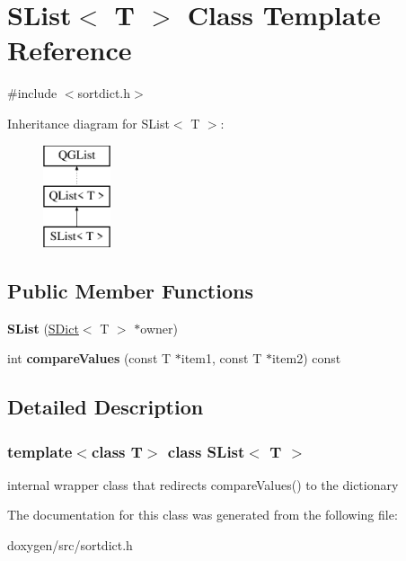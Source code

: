 \hypertarget{class_s_list}{}\section{S\+List$<$ T $>$ Class Template Reference}
\label{class_s_list}


{\ttfamily \#include $<$sortdict.\+h$>$}

Inheritance diagram for S\+List$<$ T $>$\+:\begin{figure}[H]
\begin{center}
\leavevmode
\includegraphics[height=3.000000cm]{class_s_list}
\end{center}
\end{figure}
\subsection*{Public Member Functions}
\begin{DoxyCompactItemize}
\item 
\mbox{\label{class_s_list_a1295b39ee8f007fa3d35a1a41d7db6fe}} 
{\bfseries S\+List} (\mbox{\hyperlink{class_s_dict}{S\+Dict}}$<$ T $>$ $\ast$owner)
\item 
\mbox{\label{class_s_list_a21e540fee479047ea34e99bd296ce01d}} 
int {\bfseries compare\+Values} (const T $\ast$item1, const T $\ast$item2) const
\end{DoxyCompactItemize}


\subsection{Detailed Description}
\subsubsection*{template$<$class T$>$\newline
class S\+List$<$ T $>$}

internal wrapper class that redirects compare\+Values() to the dictionary 

The documentation for this class was generated from the following file\+:\begin{DoxyCompactItemize}
\item 
doxygen/src/sortdict.\+h\end{DoxyCompactItemize}

